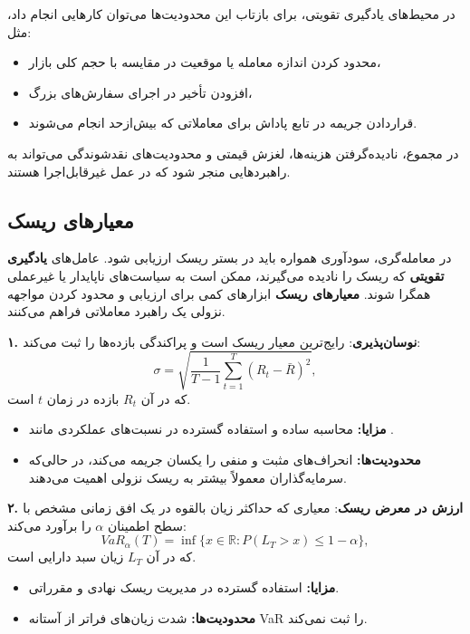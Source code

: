 \documentclass[12pt, a4paper]{report}
\begin{document}
در محیط‌های یادگیری تقویتی، برای بازتاب این محدودیت‌ها می‌توان کارهایی انجام داد، مثل:  
\begin{itemize}
    \item محدود کردن اندازه معامله یا موقعیت در مقایسه با حجم کلی بازار،  
    \item افزودن تأخیر در اجرای سفارش‌های بزرگ،  
    \item قراردادن جریمه در تابع پاداش برای معاملاتی که بیش‌ازحد انجام می‌شوند.  
\end{itemize}

\bigskip

در مجموع، نادیده‌گرفتن هزینه‌ها، لغزش قیمتی و محدودیت‌های نقدشوندگی می‌تواند به راهبردهایی منجر شود که در عمل غیرقابل‌اجرا هستند.  

\subsection{معیارهای ریسک\protect\footnotemark}\label{subsec:reward-shaping}

در معامله‌گری، سودآوری همواره باید در بستر ریسک ارزیابی شود. 
عامل‌های \textbf{یادگیری تقویتی} که ریسک را نادیده می‌گیرند، 
ممکن است به سیاست‌های ناپایدار یا غیرعملی همگرا شوند. 
\textbf{معیارهای ریسک} ابزارهای کمی برای ارزیابی و محدود کردن 
مواجهه نزولی یک راهبرد معاملاتی فراهم می‌کنند.  

\bigskip
\textbf{۱. نوسان‌پذیری}:  
رایج‌ترین معیار ریسک است و پراکندگی بازده‌ها را ثبت می‌کند:
\[
\sigma = \sqrt{\frac{1}{T-1}\sum_{t=1}^T (R_t - \bar{R})^2},
\]
که در آن $R_t$ بازده در زمان $t$ است.  
\begin{itemize}
\item \textbf{مزایا:} محاسبه ساده و استفاده گسترده در نسبت‌های عملکردی مانند .

    \item \textbf{محدودیت‌ها:} انحراف‌های مثبت و منفی را یکسان جریمه می‌کند، 
    در حالی‌که سرمایه‌گذاران معمولاً بیشتر به ریسک نزولی اهمیت می‌دهند.  
\end{itemize}

\bigskip
\textbf{۲. ارزش در معرض ریسک}:  
معیاری که حداکثر زیان بالقوه در یک افق زمانی مشخص با سطح اطمینان $\alpha$ را برآورد می‌کند:
\[
VaR_{\alpha}(T) = \inf \{ x \in \mathbb{R} : P(L_T > x) \leq 1-\alpha \},
\]
که در آن $L_T$ زیان سبد دارایی است.  
\begin{itemize}
    \item \textbf{مزایا:} استفاده گسترده در مدیریت ریسک نهادی و مقرراتی.  
    \item \textbf{محدودیت‌ها:} شدت زیان‌های فراتر از آستانه VaR را ثبت نمی‌کند.  
\end{itemize}
\end{document}
